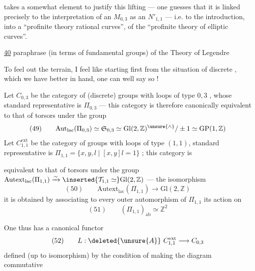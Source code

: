 
takes a somewhat  element to justify this lifting --- one
guesses that it is linked precisely to the interpretation of an $M_{0,3}$ as
an $N'_{1,1}$ --- i.e. to the introduction, into a ``profinite theory
 rational curves'', of the ``profinite theory of
elliptic curves''.


\uline{40}  paraphrase
(in terms of fundamental groups) of the Theory of Legendre

To feel out the terrain, I feel like starting first from the situation of
discrete , which we have better in hand, one can well say so !

Let $C_{0,3}$ be the category of (discrete) groups with loops of type $0,3$
, whose
standard representative is $\Pi_{0,3}$ --- this category is therefore
canonically equivalent to that of torsors under the group
\[
(49)\qquad
\mathrm{Aut}_{\mathrm{lac}}(\Pi_{0,3})
\simeq\mathfrak S_{0,3}
\simeq\mathrm{Gl}(2,\mathbb Z)^{\unsure{\wedge}}/\pm1
\simeq\mathrm{GP}(1,\mathbb Z)
\]
Let $C_{1,1}^{\mathrm{ext}}$ be the category of
 groups with loops of type $(1,1)$,
 standard representative is
$\Pi_{1,1}=\{x,y,l\mid[x,y]l=1\}$ ; this category is


equivalent to that of torsors under the group
$\mathrm{Autext}_{\mathrm{lac}}(\Pi_{1,1})
\xrightarrow{\sim}
\inserted{\mathcal T_{1,1}\simeq}\mathrm{Gl}(2,\mathbb Z)$
--- the isomorphism
\[
(50)\qquad
\mathrm{Autext}_{\mathrm{lac}}(\Pi_{1,1})\longrightarrow
\mathrm{Gl}(2,\mathbb Z)
\]
 it is obtained by associating to every outer automorphism of
$\Pi_{1,1}$ its action on
\[
(51)\qquad
(\Pi_{1,1})_{\mathrm{ab}}\simeq\mathbb Z^2
\]

One thus has a canonical functor
\[
(52)\qquad
L:\deleted{\unsure{A}}\ C_{1,1}^{\mathrm{ext}}
\longrightarrow C_{0,3}
\]
defined (up to  isomorphism) by the condition of making
the diagram commutative

